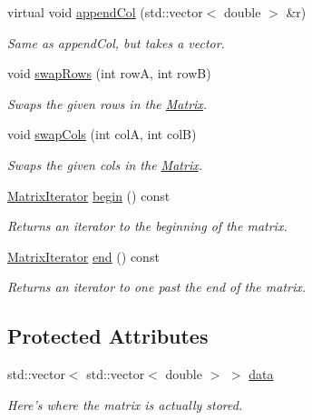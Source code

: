 \begin{DoxyCompactItemize}
virtual void \hyperlink{class_matrix_a726f7ae83284c090af821752628974af}{appendCol} (std::vector$<$ double $>$ \&r)
\begin{DoxyCompactList}\small\item\em Same as appendCol, but takes a vector. \item\end{DoxyCompactList}\item 
void \hyperlink{class_matrix_ac0e73d5e98817e12b82a3f626c8343de}{swapRows} (int rowA, int rowB)
\begin{DoxyCompactList}\small\item\em Swaps the given rows in the \hyperlink{class_matrix}{Matrix}. \item\end{DoxyCompactList}\item 
void \hyperlink{class_matrix_a505f924baa7c236280751499da56ecee}{swapCols} (int colA, int colB)
\begin{DoxyCompactList}\small\item\em Swaps the given cols in the \hyperlink{class_matrix}{Matrix}. \item\end{DoxyCompactList}\item 
\hyperlink{class_matrix_iterator}{MatrixIterator} \hyperlink{class_matrix_a8969f52f950b124d5a40128c3df11efe}{begin} () const 
\begin{DoxyCompactList}\small\item\em Returns an iterator to the beginning of the matrix. \item\end{DoxyCompactList}\item 
\hyperlink{class_matrix_iterator}{MatrixIterator} \hyperlink{class_matrix_aa6e886dcd213fdf5c54743f3b8ac7209}{end} () const 
\begin{DoxyCompactList}\small\item\em Returns an iterator to one past the end of the matrix. \item\end{DoxyCompactList}\end{DoxyCompactItemize}
\subsection*{Protected Attributes}
\begin{DoxyCompactItemize}
\item 
std::vector$<$ std::vector$<$ double $>$ $>$ \hyperlink{class_matrix_adab4557133e13b08ae470a8e5df7b99c}{data}
\begin{DoxyCompactList}\small\item\em Here's where the matrix is actually stored. \item\end{DoxyCompactList}\end{DoxyCompactItemize}



